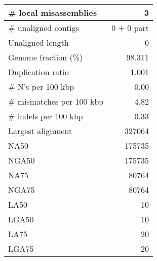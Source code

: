 \documentclass[12pt,a4paper]{article}
\begin{document}
\begin{table}[ht]
\begin{center}
\begin{tabular}{|l*{1}{|r}|}
\# local misassemblies & 3 \\ \hline
\# unaligned contigs & 0 + 0 part \\ \hline
Unaligned length & 0 \\ \hline
Genome fraction (\%) & 98.311 \\ \hline
Duplication ratio & 1.001 \\ \hline
\# N's per 100 kbp & 0.00 \\ \hline
\# mismatches per 100 kbp & 4.82 \\ \hline
\# indels per 100 kbp & 0.33 \\ \hline
Largest alignment & 327064 \\ \hline
NA50 & 175735 \\ \hline
NGA50 & 175735 \\ \hline
NA75 & 80764 \\ \hline
NGA75 & 80764 \\ \hline
LA50 & 10 \\ \hline
LGA50 & 10 \\ \hline
LA75 & 20 \\ \hline
LGA75 & 20 \\ \hline
\end{tabular}
\end{center}
\end{table}
\end{document}
